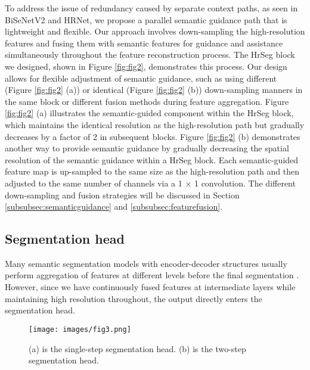 \documentclass[preprint,12pt,authoryear]{elsarticle}
\begin{document}
To address the issue of redundancy caused by separate context paths, as seen in BiSeNetV2 and HRNet, we propose a parallel semantic guidance path that is lightweight and flexible. Our approach involves down-sampling the high-resolution features and fusing them with semantic features for guidance and assistance simultaneously throughout the feature reconstruction process. The HrSeg block we designed, shown in Figure \ref{fig:fig2}, demonstrates this process. Our design allows for flexible adjustment of semantic guidance, such as using different (Figure \ref{fig:fig2} (a)) or identical (Figure \ref{fig:fig2} (b)) down-sampling manners in the same block or different fusion methods during feature aggregation.
Figure \ref{fig:fig2} (a) illustrates the semantic-guided component within the HrSeg block, which maintains the identical resolution as the high-resolution path but gradually decreases by a factor of 2 in subsequent blocks.
Figure \ref{fig:fig2} (b) demonstrates another way to provide semantic guidance by gradually decreasing the spatial resolution of the semantic guidance within a HrSeg block. Each semantic-guided feature map is up-sampled to the same size as the high-resolution path and then adjusted to the same number of channels via a 1 × 1 convolution. The different down-sampling and fusion strategies will be discussed in Section \ref{subsubsec:semanticguidance} and \ref{subsubsec:featurefusion}.







\subsection{Segmentation head}
\label{subsec:Segmentationhead}

Many semantic segmentation models with encoder-decoder structures usually perform aggregation of features at different levels before the final segmentation \citep{howard_searching_2019, peng_pp-liteseg_2022}. However, since we have continuously fused features at intermediate layers while maintaining high resolution throughout, the output directly enters the segmentation head.


\begin{figure}[t]
    \hspace{-2cm}
    \centering
    \texttt{[image: images/fig3.png]}
    \caption{(a) is the single-step segmentation head. (b) is the two-step segmentation head.}
    \label{fig:fig3}
\end{figure}
\end{document}
